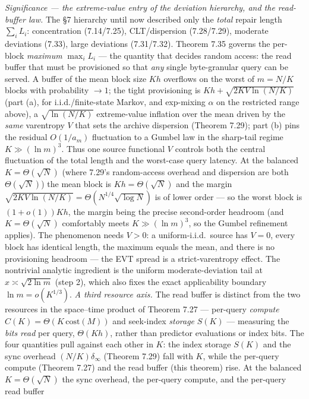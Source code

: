 \documentclass[
]{article}
\begin{document}
\emph{Significance --- the extreme-value entry of the deviation hierarchy, and the
read-buffer law.} The §7 hierarchy until now described only the \emph{total} repair length
$\sum_iL_i$: concentration (7.14/7.25), CLT/dispersion (7.28/7.29), moderate deviations
(7.33), large deviations (7.31/7.32). Theorem 7.35 governs the per-block \emph{maximum}
$\max_iL_i$ --- the quantity that decides random access: the read buffer that must be
provisioned so that \emph{any} single byte-granular query can be served. A buffer of the
mean block size $Kh$ overflows on the worst of $m=N/K$ blocks with probability $\to1$; the
tight provisioning is $Kh+\sqrt{2KV\ln(N/K)}$ (part (a), for i.i.d./finite-state Markov, and
exp-mixing $\alpha$ on the restricted range above), a $\sqrt{\ln(N/K)}$ extreme-value
inflation over the mean driven by the \emph{same}
varentropy $V$ that sets the archive dispersion (Theorem 7.29); part (b) pins the residual
$O(1/a_m)$ fluctuation to a Gumbel law in the sharp-tail regime $K\gg(\ln m)^3$. Thus one
source functional $V$ controls both the central fluctuation of the total length and the
worst-case query latency. At the balanced $K=\Theta(\sqrt N)$ (where 7.29's random-access
overhead and dispersion are both $\Theta(\sqrt N)$) the mean block is $Kh=\Theta(\sqrt N)$
and the margin $\sqrt{2KV\ln(N/K)}=\Theta(N^{1/4}\sqrt{\log N})$ is of lower order --- so
the worst block is $(1+o(1))Kh$, the margin being the precise second-order headroom (and
$K=\Theta(\sqrt N)$ comfortably meets $K\gg(\ln m)^3$, so the Gumbel refinement applies).
The phenomenon needs $V>0$: a uniform-i.i.d.\ source has $V=0$, every block has identical
length, the maximum equals the mean, and there is no provisioning headroom --- the EVT
spread is a strict-varentropy effect. The nontrivial analytic ingredient is the uniform
moderate-deviation tail at $x\asymp\sqrt{2\ln m}$ (step 2), which also fixes the exact
applicability boundary $\ln m=o(K^{1/3})$. \emph{A third resource axis.} The read buffer is
distinct from the two resources in the space--time product of Theorem 7.27 --- per-query
\emph{compute} $C(K)=\Theta(K\,\mathrm{cost}(M))$ and seek-index \emph{storage} $S(K)$ ---
measuring the \emph{bits read} per query, $\Theta(Kh)$, rather than predictor evaluations or
index bits. The four quantities pull against each other in $K$: the index storage $S(K)$ and
the sync overhead $(N/K)\delta_\infty$ (Theorem 7.29) fall with $K$, while the per-query
compute (Theorem 7.27) and the read buffer (this theorem) rise. At the balanced
$K=\Theta(\sqrt N)$ the sync overhead, the per-query compute, and the per-query read buffer
\end{document}
